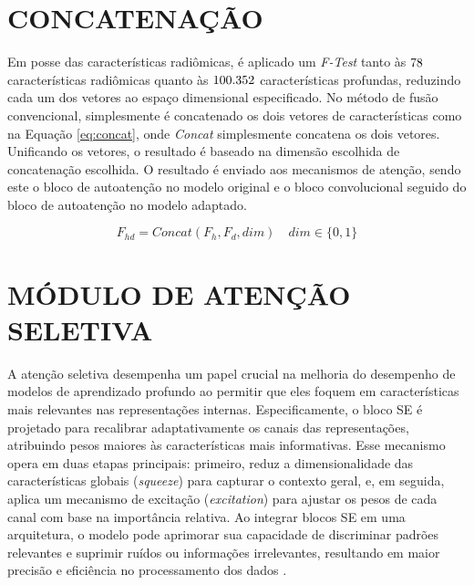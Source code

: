 \section{CONCATENAÇÃO}
\label{subsec:cap4_concatenacao}

Em posse das características radiômicas, é aplicado um \textit{F-Test} tanto às $78$ características radiômicas quanto às $100.352$ características profundas, reduzindo cada um dos vetores ao espaço dimensional especificado. No método de fusão convencional, simplesmente é concatenado os dois vetores de características como na Equação \ref{eq:concat}, onde \textit{Concat} simplesmente concatena os dois vetores. Unificando os vetores, o resultado é baseado na dimensão escolhida de concatenação escolhida. O resultado é enviado aos mecanismos de atenção, sendo este o bloco de autoatenção no modelo original e o bloco convolucional seguido do bloco de autoatenção no modelo adaptado.

\begin{equation}
F_{hd} = \textit{Concat}(F_h, F_d, dim) \quad dim \in \{0,1\}
\label{eq:concat}
\end{equation}

\section{MÓDULO DE ATENÇÃO SELETIVA}
\label{subsec:cap4_mod_selective_attn}

A atenção seletiva desempenha um papel crucial na melhoria do desempenho de modelos de aprendizado profundo ao permitir que eles foquem em características mais relevantes nas representações internas. Especificamente, o bloco \gls{SE} é projetado para recalibrar adaptativamente os canais das representações, atribuindo pesos maiores às características mais informativas. Esse mecanismo opera em duas etapas principais: primeiro, reduz a dimensionalidade das características globais (\textit{squeeze}) para capturar o contexto geral, e, em seguida, aplica um mecanismo de excitação (\textit{excitation}) para ajustar os pesos de cada canal com base na importância relativa. Ao integrar blocos SE em uma arquitetura, o modelo pode aprimorar sua capacidade de discriminar padrões relevantes e suprimir ruídos ou informações irrelevantes, resultando em maior precisão e eficiência no processamento dos dados \cite{huSqueezeandExcitationNetworks2018}.

